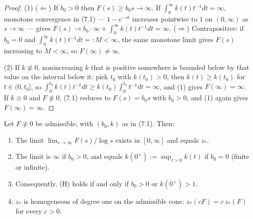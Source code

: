 \begin{proof}
(1) ($\Leftarrow$) If $b_0 > 0$ then $F(s) \ge b_0 s \to \infty$. If $\int_0^\infty k(t)t^{-1}dt =
\infty$, monotone convergence in (7.1) --- $1 - e^{-st}$ increases pointwise to $1$ on
$(0,\infty)$ as $s \to \infty$ --- gives $F(s) \to b_0\cdot\infty + \int_0^\infty k(t)t^{-1}dt =
\infty$. ($\Rightarrow$) Contrapositive: if $b_0 = 0$ and $\int_0^\infty k(t)t^{-1}dt =: M <
\infty$, the same monotone limit gives $F(s)$ increasing to $M < \infty$, so
$F(\infty) \ne \infty$.

(2) If $k \not\equiv 0$, nonincreasing $k$ that is positive somewhere is bounded below by that
value on the interval below it: pick $t_0$ with $k(t_0) > 0$, then $k(t) \ge k(t_0)$ for
$t \in (0,t_0]$, so $\int_0^{t_0} k(t)t^{-1}dt \ge k(t_0)\int_0^{t_0}t^{-1}dt = \infty$, and (1)
gives $F(\infty) = \infty$. If $k \equiv 0$ and $F \not\equiv 0$, (7.1) reduces to $F(s) = b_0 s$
with $b_0 > 0$, and (1) again gives $F(\infty) = \infty$.
\end{proof}

\begin{lemma}\label{lem:zstar-log-growth}
Let $F \not\equiv 0$ be admissible, with $(b_0, k)$ as in (7.1). Then:
\begin{enumerate}
\item The limit $\lim_{s\to\infty} F(s)/\log s$ exists in $[0,\infty]$ and equals $z_*$.
\item The limit is $\infty$ if $b_0 > 0$, and equals $k(0^+) := \sup_{t>0} k(t)$ if $b_0 = 0$
(finite or infinite).
\item Consequently, (H) holds if and only if $b_0 > 0$ or $k(0^+) > 1$.
\item $z_*$ is homogeneous of degree one on the admissible cone: $z_*(cF) = c\,z_*(F)$ for every
$c > 0$.
\end{enumerate}
\end{lemma}

